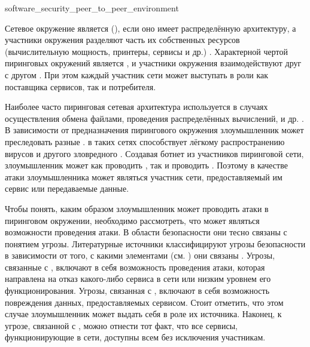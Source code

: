 	{software_security_peer_to_peer_environment}

%
Сетевое окружение является  (), если оно имеет распределённую архитектуру, а участники окружения разделяют часть их собственных ресурсов (вычислительную мощность, принтеры, сервисы и др.) .
%
Характерной чертой пиринговых окружений является , и участники окружения взаимодействуют друг с другом . 
%
При этом каждый участник сети может выступать в роли как поставщика сервисов, так и потребителя. 

%
Наиболее часто пиринговая сетевая архитектура используется в случаях осуществления обмена файлами, проведения распределённых вычислений,  и др. .
%
%
В зависимости от предназначения пирингового окружения злоумышленник может преследовать разные   . 
%
 в таких сетях способствует лёгкому распространению вирусов и другого зловредного . 
%
Создавая ботнет из участников пиринговой сети, злоумышленник может как проводить , так и проводить . 
%
Поэтому в качестве  атаки злоумышленника может являться участник сети, предоставляемый им сервис или передаваемые данные. 

%
Чтобы понять, каким образом злоумышленник может проводить атаки в пиринговом окружении, необходимо рассмотреть, что может являться  возможности проведения атаки.
%
В области безопасности они тесно связаны с понятием угрозы.
%
Литературные источники классифицируют угрозы безопасности в зависимости от того, с какими элементами  (см. ) они связаны   . 
%
Угрозы, связанные с , включают в себя возможность проведения атаки, которая направлена на отказ какого-либо сервиса в сети или низким уровнем его функционирования. 
%
Угрозы, связанная с , включают в себя возможность повреждения данных, предоставляемых сервисом. 
%
Стоит отметить, что этом случае злоумышленник может выдать себя в роле их источника. 
%
Наконец, к угрозе, связанной с , можно отнести тот факт, что все сервисы, функционирующие в сети, доступны всем без исключения участникам.

